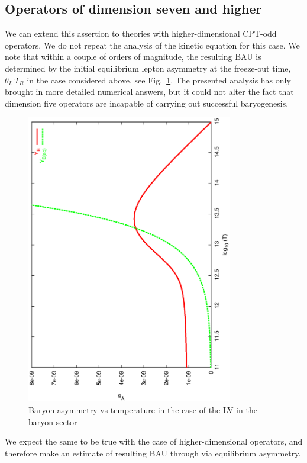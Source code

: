 \documentclass[12pt]{revtex4}
\begin{document}
\subsection{Operators of dimension seven and higher}

	We can extend this assertion to theories with higher-dimensional 
	CPT-odd operators. 
	We do not repeat the analysis of the kinetic equation 
	for this case.
	We note that within a couple of orders of magnitude, the resulting BAU
	is determined by the initial equilibrium lepton asymmetry
	at the freeze-out time, $ \theta_L\,T_R $ in the case considered
	above, see Fig.~\ref{b_dom_asymm_bau}.
	The presented analysis has only brought in more 
	detailed numerical answers, but it could not alter the fact that
	dimension five operators are incapable of carrying out successful
	baryogenesis.
\begin{figure}
\includegraphics[width=9cm,angle=270]{b_dom_asymm_bau.ps}
\caption{Baryon asymmetry vs temperature in the case of the LV in the baryon sector}
\label{b_dom_asymm_bau}
\end{figure}
	
	We expect the same to be true with the case of higher-dimensional
	operators, and therefore make an estimate of resulting BAU through
	via equilibrium asymmetry.
\end{document}
